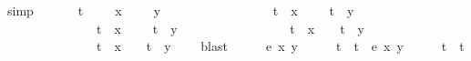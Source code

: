 \begin{isabellebody}
{\isacharparenleft}simp{\isacharparenright}\isanewline
\ \ \isamarkupfalse%
\ \isamarkupfalse%
\ {\isacharparenleft}{}{\isacharparenright}\ {\isachardoublequoteopen}t\ {\isacharequal}\ {}{\isachardoublequoteclose}\ {\isacharbar}\ {\isacharparenleft}{}{\isacharparenright}\ {\isachardoublequoteopen}x\ {\isacharequal}\ {}{\isachardoublequoteclose}\ {\isacharbar}\ {\isacharparenleft}{}{\isacharparenright}\ {\isachardoublequoteopen}y\ {\isacharequal}\ {}{\isachardoublequoteclose}\ {\isacharbar}\isanewline
\ \ \ \ \ \ \ \ \ \ \ \ \ {\isacharparenleft}{}{\isacharparenright}\ {\isachardoublequoteopen}t\ {\isacharasterisk}\ x\ {\isacharequal}\ {\isacharminus}\ {}\ {\isasymand}\ t\ {\isacharasterisk}\ y\ {\isacharequal}\ {\isacharminus}\ {}{\isachardoublequoteclose}\ {\isacharbar}\isanewline
\ \ \ \ \ \ \ \ \ \ \ \ \ {\isacharparenleft}{}{\isacharparenright}\ {\isachardoublequoteopen}t\ {\isacharasterisk}\ x\ {\isacharequal}\ {\isacharminus}\ {}\ {\isasymand}\ t\ {\isacharasterisk}\ y\ {\isacharequal}\ {}{\isachardoublequoteclose}\ {\isacharbar}\isanewline
\ \ \ \ \ \ \ \ \ \ \ \ \ {\isacharparenleft}{}{\isacharparenright}\ {\isachardoublequoteopen}t\ {\isacharasterisk}\ x\ {\isacharequal}\ {}\ {\isasymand}\ t\ {\isacharasterisk}\ y\ {\isacharequal}\ {\isacharminus}\ {}{\isachardoublequoteclose}\ {\isacharbar}\isanewline
\ \ \ \ \ \ \ \ \ \ \ \ \ {\isacharparenleft}{}{\isacharparenright}\ {\isachardoublequoteopen}t\ {\isacharasterisk}\ x\ {\isacharequal}\ {}\ {\isasymand}\ t\ {\isacharasterisk}\ y\ {\isacharequal}\ {}{\isachardoublequoteclose}\ \isamarkupfalse%
\ blast\isanewline
\ \ \isamarkupfalse%
\ \isamarkupfalse%
\ {\isachardoublequoteopen}e{\isacharprime}\ x\ y\ {\isacharequal}\ {}\ {\isacharasterisk}\ {\isacharparenleft}{}\ {\isacharminus}\ t{\isacharparenright}\ {\isacharslash}\ t\ {\isasymor}\ e{\isacharprime}\ x\ y\ {\isacharequal}\ {}\ {\isacharasterisk}\ {\isacharparenleft}{\isacharminus}{}\ {\isacharminus}\ t{\isacharparenright}\ {\isacharslash}\ t{\isachardoublequoteclose}\isanewline
\ \ \ \ \isamarkupfalse%

\end{isabellebody}
